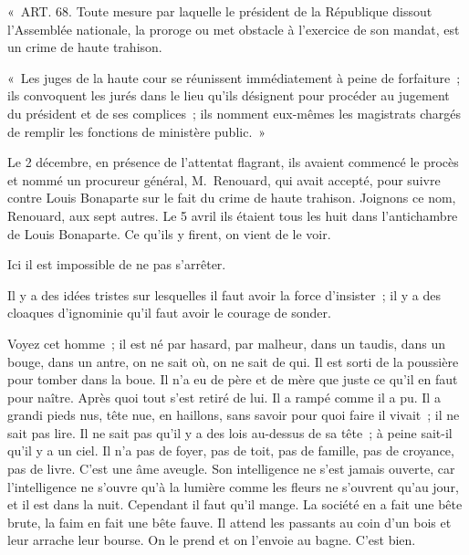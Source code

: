 \documentclass[french,twoside]{book} %
\newenvironment{quoteblock}%
  {\begin{quoting}}
  {\end{quoting}}
\newenvironment{quotebar}{%
    \def\FrameCommand{{\color{rubric!10!}\vrule width 0.5em} \hspace{0.9em}}%
    \def\OuterFrameSep{\itemsep} %
    \MakeFramed {\advance\hsize-\width \FrameRestore}
  }%
  {%
    \endMakeFramed
  }
\renewenvironment{quoteblock}%
  {%
    \savenotes
    \setstretch{0.9}
    \normalfont
    \begin{quotebar}
  }
  {%
    \end{quotebar}
    \spewnotes
  }
\begin{document}
\begin{quoteblock}
 \noindent « ART. 68. Toute mesure par laquelle le président de la République dissout l’Assemblée nationale, la proroge ou met obstacle à l’exercice de son mandat, est un crime de haute trahison.\par
 « Les juges de la haute cour se réunissent immédiatement à peine de forfaiture ; ils convoquent les jurés dans le lieu qu’ils désignent pour procéder au jugement du président et de ses complices ; ils nomment eux-mêmes les magistrats chargés de remplir les fonctions de ministère public. »
 \end{quoteblock}

\noindent Le 2 décembre, en présence de l’attentat flagrant, ils avaient commencé le procès et nommé un procureur général, M. Renouard, qui avait accepté, pour suivre contre Louis Bonaparte sur le fait du crime de haute trahison. Joignons ce nom, Renouard, aux sept autres. Le 5 avril ils étaient tous les huit dans l’antichambre de Louis Bonaparte. Ce qu’ils y firent, on vient de le voir.\par
Ici il est impossible de ne pas s’arrêter.\par
Il y a des idées tristes sur lesquelles il faut avoir la force d’insister ; il y a des cloaques d’ignominie qu’il faut avoir le courage de sonder.\par
Voyez cet homme ; il est né par hasard, par malheur, dans un taudis, dans un bouge, dans un antre, on ne sait où, on ne sait de qui. Il est sorti de la poussière pour tomber dans la boue. Il n’a eu de père et de mère que juste ce qu’il en faut pour naître. Après quoi tout s’est retiré de lui. Il a rampé comme il a pu. Il a grandi pieds nus, tête nue, en haillons, sans savoir pour quoi faire il vivait ; il ne sait pas lire. Il ne sait pas qu’il y a des lois au-dessus de sa tête ; à peine sait-il qu’il y a un ciel. Il n’a pas de foyer, pas de toit, pas de famille, pas de croyance, pas de livre. C’est une âme aveugle. Son intelligence ne s’est jamais ouverte, car l’intelligence ne s’ouvre qu’à la lumière comme les fleurs ne s’ouvrent qu’au jour, et il est dans la nuit. Cependant il faut qu’il mange. La société en a fait une bête brute, la faim en fait une bête fauve. Il attend les passants au coin d’un bois et leur arrache leur bourse. On le prend et on l’envoie au bagne. C’est bien.\par
\end{document}
